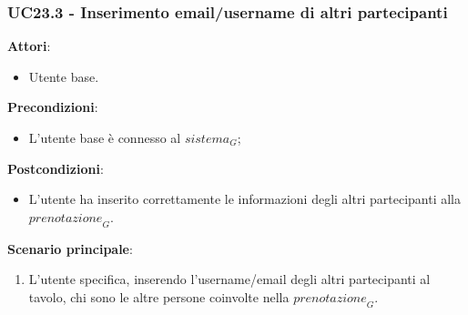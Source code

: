 \subsubsection{UC23.3 - Inserimento email/username di altri partecipanti}\label{usecase:23_3}
\textbf{Attori}:
\begin{itemize}
    \item Utente base.
\end{itemize}
\textbf{Precondizioni}:
\begin{itemize}
    \item L'utente base è connesso al $\textit{sistema}_G$;
\end{itemize}
\textbf{Postcondizioni}:
\begin{itemize}
    \item L'utente ha inserito correttamente le informazioni degli altri partecipanti alla $\textit{prenotazione}_G$.
\end{itemize}
\textbf{Scenario principale}:
\begin{enumerate}
    \item L'utente specifica, inserendo l'username/email degli altri partecipanti al tavolo, chi sono le altre persone coinvolte nella $\textit{prenotazione}_G$.
\end{enumerate}

\newpage